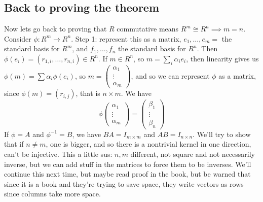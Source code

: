 \documentclass{article}
\theoremstyle{plain}
\theoremstyle{remark}
\begin{document}
\subsection{Back to proving the theorem}
Now lets go back to proving that $R$ commutative means
$R^m \cong R^n \implies m = n$.
Consider $\phi \colon R^m \to R^n$.
Step 1: represent this as a matrix,
$e_1,\dots,e_m = $ the standard basis for $R^m$,
and $f_1,\dots,f_n$ the standard basis for $R^n$.
Then $\phi(e_i) = (r_{1,i},\dots,r_{n,i}) \in R^n$.
If $m \in R^n$, so $m = \sum_i \alpha_i e_i$,
then linearity gives us $\phi(m) = \sum \alpha_i \phi(e_i)$,
so $m = \begin{pmatrix} \alpha_1 \\ \vdots \\ \alpha_m \end{pmatrix}$,
and so we can represent $\phi$ as a matrix,
since $\phi(m) = (r_{i,j})$, that is $n \times m$.
We have
\[
	\phi\begin{pmatrix} \alpha_1 \\ \vdots \\ \alpha_m\end{pmatrix}
	= \begin{pmatrix} \beta_1 \\ \vdots \\ \beta_n \end{pmatrix}
\]
If $\phi = A$ and $\phi^{-1} = B$, we have $BA = I_{m \times m}$
and $AB = I_{n \times n}$.
We'll try to show that if $n \neq m$, one is bigger,
and so there is a nontrivial kernel in one direction, can't be injective.
This a little sus: $n,m$ different, not square and not necessarily inverse,
but we can add stuff in the matrices to force them to be inverses.
We'll continue this next time, but
maybe read proof in the book, but be warned that since it is a book
and they're trying to save space, they write vectors as rows since columns take more space.
\end{document}
